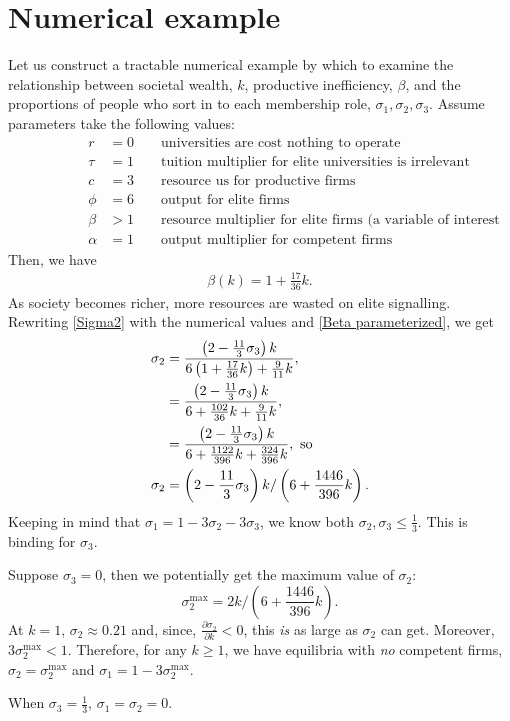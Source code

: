 \documentclass[12pt,letterpaper]{article}
\begin{document}
	\section{Numerical example}
	Let us construct a tractable numerical example by which to examine the relationship between societal wealth, $k$, productive inefficiency, $\beta$, and the proportions of people who sort in to each membership role, $\sigma_1,\sigma_2,\sigma_3$.
	Assume parameters take the following values:
		\begin{align*}
		\phantom{====}	r&=0&&\text{ universities are cost nothing to operate}\\
		\phantom{====}	\tau&=1&&\text{ tuition multiplier for elite universities is irrelevant}\\
		\phantom{====}	c&=3&&\text{ resource us for productive firms}\\
		\phantom{====}	\phi&=6&&\text{ output for elite firms}\\
		\phantom{====}	\beta&>1&&\text{ resource multiplier for elite firms (a variable of interest in the analysis)}\\
		\phantom{====}	\alpha&=1&&\text{ output multiplier for competent firms}		
	\end{align*}
	Then, we have 
	\begin{align}
		\beta(k)=1+\frac{17}{36}k.\label{Beta parameterized}
	\end{align}
	As society becomes richer, more resources are wasted on elite signalling. Rewriting \eqref{Sigma2} with the numerical values and \eqref{Beta parameterized}, we get
	\begin{align}
		\sigma_2
		&=\frac{\left(2-\frac{11}{3}\sigma_3\right)k}
		{6\left(1+\frac{17}{36}k\right)+\frac{9}{11}k},\notag\\
		&=\frac{\left(2-\frac{11}{3}\sigma_3\right)k}
		{6+\frac{102}{36}k+\frac{9}{11}k},\notag\\
		&=\frac{\left(2-\frac{11}{3}\sigma_3\right)k}
		{6+\frac{1122}{396}k+\frac{324}{396}k},\text{ so}\notag\\
		\sigma_2
		&=\left(2-\frac{11}{3}\sigma_3\right)k/
		\left(6+\frac{1446}{396}k\right).\label{Sigma2 of k}
	\end{align}
	Keeping in mind that $\sigma_1=1-3\sigma_2-3\sigma_3$, we know both $\sigma_2,\sigma_3\le\frac{1}{3}$.
	This is binding for $\sigma_3$.
	
	Suppose $\sigma_3=0$, then we potentially get the maximum value of $\sigma_2$:
	\[
	\sigma_2^{\max}=2k/\left(6+\frac{1446}{396}k\right).
	\]
	At $k=1$, $\sigma_2\approx 0.21$ and, since, $\frac{\partial \sigma_2}{\partial k}<0$, this \textit{is} as large as $\sigma_2$ can get. 
	Moreover, $3\sigma_2^{\max}<1$.
	Therefore, for any $k\ge 1$, we have equilibria with \textit{no} competent firms, $\sigma_2=\sigma_2^{\max}$ and $\sigma_1=1-3\sigma_2^{\max}$.
	
	When $\sigma_3=\frac{1}{3}$, $\sigma_1=\sigma_2=0$. 
	
	
	
	
	
%	
	
	
	
\end{document}
